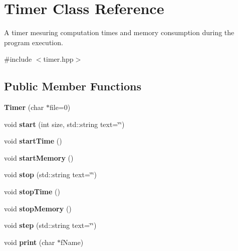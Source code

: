 \hypertarget{class_timer}{}\section{Timer Class Reference}
\label{class_timer}


A timer mesuring computation times and memory consumption during the program execution.  




{\ttfamily \#include $<$timer.\+hpp$>$}

\subsection*{Public Member Functions}
\begin{DoxyCompactItemize}
\item 
\hypertarget{class_timer_a14edf0bdfc5a214895d321e7ae69365b}{}{\bfseries Timer} (char $\ast$file=0)\label{class_timer_a14edf0bdfc5a214895d321e7ae69365b}

\item 
\hypertarget{class_timer_acc61f0c4f2c1e26ba0bb62d367f0977e}{}void {\bfseries start} (int size, std\+::string text=\char`\"{}\char`\"{})\label{class_timer_acc61f0c4f2c1e26ba0bb62d367f0977e}

\item 
\hypertarget{class_timer_a5771baafd265be353ab78a4bb77329f9}{}void {\bfseries start\+Time} ()\label{class_timer_a5771baafd265be353ab78a4bb77329f9}

\item 
\hypertarget{class_timer_afada34fd58fb4729b9a6ee7a445f5133}{}void {\bfseries start\+Memory} ()\label{class_timer_afada34fd58fb4729b9a6ee7a445f5133}

\item 
\hypertarget{class_timer_afc259e85201ab94f291b36ed97dbd5e2}{}void {\bfseries stop} (std\+::string text=\char`\"{}\char`\"{})\label{class_timer_afc259e85201ab94f291b36ed97dbd5e2}

\item 
\hypertarget{class_timer_a71c4bba47ccad8ed4131922d1cd6d689}{}void {\bfseries stop\+Time} ()\label{class_timer_a71c4bba47ccad8ed4131922d1cd6d689}

\item 
\hypertarget{class_timer_a55ad7a96c2e75c4a1a7209c8eb89ee9d}{}void {\bfseries stop\+Memory} ()\label{class_timer_a55ad7a96c2e75c4a1a7209c8eb89ee9d}

\item 
\hypertarget{class_timer_a88fa29d9f2422df0ad2ed43b1c28cc04}{}void {\bfseries step} (std\+::string text=\char`\"{}\char`\"{})\label{class_timer_a88fa29d9f2422df0ad2ed43b1c28cc04}

\item 
\hypertarget{class_timer_af29968e93e56c8bf1de7c9f559dfae23}{}void {\bfseries print} (char $\ast$f\+Name)\label{class_timer_af29968e93e56c8bf1de7c9f559dfae23}

\end{DoxyCompactItemize}


